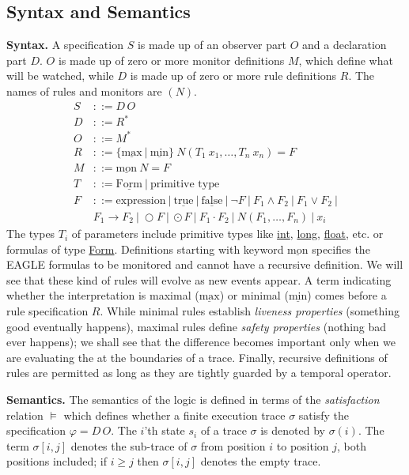 \documentclass[english]{article}
\begin{document}
\subsection{Syntax and Semantics}
\textbf{Syntax.}
A specification $S$ is made up of an observer part $O$ and a declaration part $D$. $O$ is made up of zero or more monitor definitions $M$, which define what will be watched, while $D$ is made up of zero or more rule definitions $R$. The names of rules and monitors are $(N)$.
\begin{align*}
    S &::= D \, O \\
    D &::= R^* \\
    O &::= M^* \\
    R &::= \{\underline{\text{max}}\ |\ \underline{\text{min}} \}\ N(T_1\ x_1, \ldots, T_n\ x_n) = F \\
    M &::= \underline{\text{mon}}\ N = F \\
    T &::= \underline{\text{Form}}\ |\ \text{primitive type} \\
    F &::= \text{expression}\ |\ \underline{\text{true}}\ |\ \underline{\text{false}}\ |\ \neg F\ |\ F_1 \land F_2\ |\ F_1 \lor F_2\ |\\
            &F_1 \rightarrow F_2\ |\ \bigcirc F\ |\ \odot F\ |\ F_1 \cdot F_2\ |\ N(F_1, \ldots, F_n)\ |\ x_i
\end{align*}
The types $T_i$ of parameters include primitive types like \underline{int}, \underline{long}, \underline{float}, etc. or formulas of type \underline{Form}. Definitions starting with keyword $\underline{\text{mon}}$ specifies the EAGLE formulas to be monitored and cannot have a recursive definition. We will see that these kind of rules will evolve as new events appear. 
A term indicating whether the interpretation is maximal ($\underline{\text{max}}$) or minimal ($\underline{\text{min}}$) comes before a rule specification $R$. While minimal rules establish \textit{liveness properties} (something good eventually happens), maximal rules define \textit{safety properties} (nothing bad ever happens); we shall see that the difference becomes important only when we are evaluating the at the boundaries of a trace. Finally, recursive definitions of rules are permitted as long as they are tightly guarded by a temporal operator. 

\textbf{Semantics.} The semantics of the logic is defined in terms of the \textit{satisfaction} relation $\models$ which defines whether a finite execution trace $\sigma$ satisfy the specification $\varphi=D \, O$. The $i$'th state $s_i$ of a trace $\sigma$ is denoted by $\sigma(i)$. The term $\sigma[i, j]$ denotes the sub-trace of $\sigma$ from position $i$ to position $j$, both positions included; if $i \geq j$ then $\sigma[i, j]$ denotes the empty trace.
\end{document}
